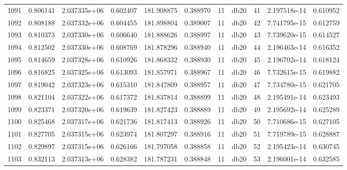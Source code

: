 \begin{tabular}{lrrrrrrlrrr}
1091 &    0.806141 &        2.037335e+06 &  0.602407 &              181.908875 &    0.388970 &      11 &         db20 &     41 &   2.197518e-14 &      0.610952 \\
1092 &    0.808188 &        2.037332e+06 &  0.604455 &              181.898804 &    0.389007 &      11 &         db20 &     42 &   7.741795e-15 &      0.612759 \\
1093 &    0.810373 &        2.037330e+06 &  0.606640 &              181.888626 &    0.388997 &      11 &         db20 &     43 &   7.739620e-15 &      0.614527 \\
1094 &    0.812502 &        2.037330e+06 &  0.608769 &              181.878296 &    0.388940 &      11 &         db20 &     44 &   2.196463e-14 &      0.616352 \\
1095 &    0.814659 &        2.037328e+06 &  0.610926 &              181.868332 &    0.388930 &      11 &         db20 &     45 &   2.196702e-14 &      0.618124 \\
1096 &    0.816825 &        2.037325e+06 &  0.613093 &              181.857971 &    0.388967 &      11 &         db20 &     46 &   7.732615e-15 &      0.619882 \\
1097 &    0.819042 &        2.037323e+06 &  0.615310 &              181.847809 &    0.388957 &      11 &         db20 &     47 &   7.734780e-15 &      0.621705 \\
1098 &    0.821104 &        2.037322e+06 &  0.617372 &              181.837814 &    0.388899 &      11 &         db20 &     48 &   2.195491e-14 &      0.623493 \\
1099 &    0.823371 &        2.037320e+06 &  0.619639 &              181.827423 &    0.388889 &      11 &         db20 &     49 &   2.195692e-14 &      0.625289 \\
1100 &    0.825468 &        2.037317e+06 &  0.621736 &              181.817413 &    0.388926 &      11 &         db20 &     50 &   7.710686e-15 &      0.627105 \\
1101 &    0.827705 &        2.037315e+06 &  0.623974 &              181.807297 &    0.388916 &      11 &         db20 &     51 &   7.719789e-15 &      0.628887 \\
1102 &    0.829897 &        2.037315e+06 &  0.626166 &              181.797058 &    0.388858 &      11 &         db20 &     52 &   2.195423e-14 &      0.630745 \\
1103 &    0.832113 &        2.037313e+06 &  0.628382 &              181.787231 &    0.388848 &      11 &         db20 &     53 &   2.196001e-14 &      0.632585 \\

\end{tabular}
